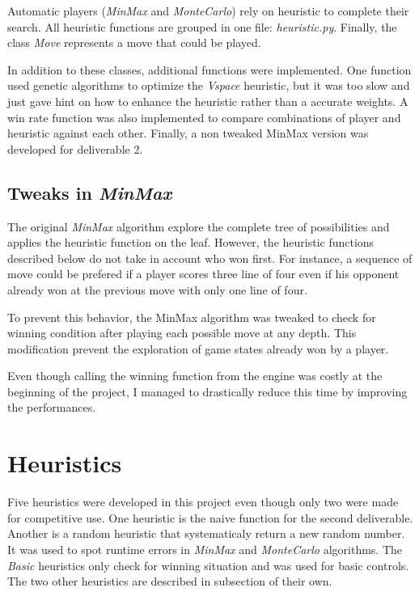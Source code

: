 \documentclass[runningheads]{llncs}
\begin{document}
Automatic players (\textit{MinMax} and
\textit{MonteCarlo}) rely on heuristic to complete
their search. All heuristic functions are grouped
in one file: \textit{heuristic.py}.
Finally, the class \textit{Move} represents a move
that could be played.

In addition to these classes, additional functions
were implemented. One function used genetic
algorithms to optimize the \textit{Vspace}
heuristic, but it was too slow and just gave hint
on how to enhance the heuristic rather than a
accurate weights.  A win rate function was also
implemented to compare combinations of player and
heuristic against each other. Finally, a non
tweaked MinMax version was developed for
deliverable 2.

\subsection{Tweaks in \textit{MinMax}}
The original \textit{MinMax} algorithm explore the
complete tree of possibilities and applies the
heuristic function on the leaf. However, the
heuristic functions described below do not take in
account who won first. For instance, a sequence of
move could be prefered if a player scores three
line of four even if his opponent already won at
the previous move with only one line of four.

To prevent this behavior, the MinMax algorithm was
tweaked to check for winning condition after
playing each possible move at any depth. This
modification prevent the exploration of game
states already won by a player.

Even though calling the winning function from the
engine was costly at the beginning of the project,
I managed to drastically reduce this time by
improving the performances.

\section{Heuristics}
Five heuristics were developed in this project
even though only two were made for competitive
use. One heuristic is the naive function for the
second deliverable. Another is a random heuristic
that systematicaly return a new random number. It
was used to spot runtime errors in \textit{MinMax} and
\textit{MonteCarlo} algorithms. The \textit{Basic}
heuristics only check for winning situation and
was used for basic controls.
The two other heuristics are described in
subsection of their own.
\end{document}
